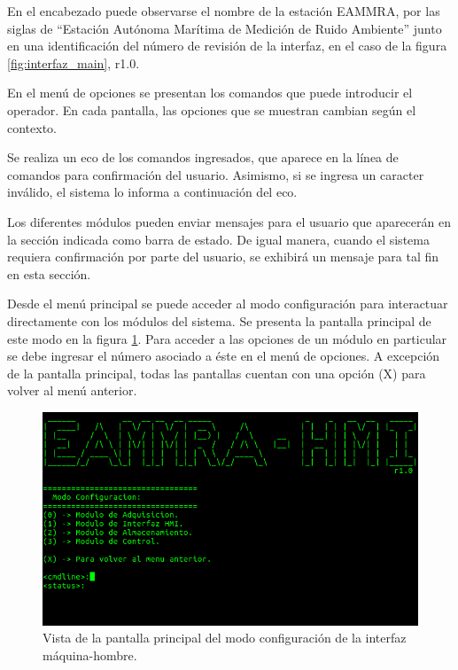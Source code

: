 En el encabezado puede observarse el nombre de la estación EAMMRA, por las siglas de ``Estación Autónoma Marítima de Medición de Ruido Ambiente'' junto en una identificación del número de revisión de la interfaz, en el caso de la figura \ref{fig:interfaz_main}, r1.0. 

En el menú de opciones se presentan los comandos que puede introducir el operador. En cada pantalla, las opciones que se muestran cambian según el contexto.

Se realiza un eco de los comandos ingresados, que aparece en la línea de comandos para confirmación del usuario. Asimismo, si se ingresa un caracter inválido, el sistema lo informa a continuación del eco.

Los diferentes módulos pueden enviar mensajes para el usuario que aparecerán en la sección indicada como barra de estado.  De igual manera, cuando el sistema requiera confirmación por parte del usuario, se exhibirá un mensaje para tal fin en esta sección.

Desde el menú principal se puede acceder al modo configuración para interactuar directamente con los módulos del sistema.  Se presenta la pantalla principal de este modo en la figura \ref{fig:interfaz_config}.  Para acceder a las opciones de un módulo en particular se debe ingresar el número asociado a éste en el menú de opciones.  A excepción de la pantalla principal, todas las pantallas cuentan con una opción (X) para volver al menú anterior.

\begin{figure}[htpb]
	\centering
	\includegraphics[width=\textwidth]{./Figures/interfaz_config.png}
	\caption[]{Vista de la pantalla principal del modo configuración de la interfaz máquina-hombre.}
	\label{fig:interfaz_config}
\end{figure}

